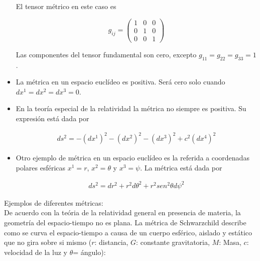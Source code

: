 \begin{remark}
\begin{itemize}


El tensor métrico en este caso es 

$$g_{ij}=\left(\begin{array}{ccc} 1 & 0 & 0 \\  0 & 1 & 0 \\ 0  & 0 & 1
\end{array}
 \right)$$



\bigskip



Las componentes del tensor fundamental son cero, excepto $g_{11}=g_{22}=g_{33}=1$.





    \item 
    La métrica en un espacio euclídeo es positiva. Será cero solo cuando $ dx^{1}= dx^{2} =dx^{3}=0 $.
    
    \item 
    En la teoría especial de la relatividad  la métrica no siempre es positiva. Su expresión está dada por

\begin{eqnarray}\label{ec_8}
ds^{2}=-  (dx^{1})^2-  (dx^{2})^2- (dx^{3})^2 + c^{2}(dx^{4})^2
\end{eqnarray}
\bigskip
\item
   Otro ejemplo de métrica en un espacio euclídeo es la referida  a coordenadas polares esféricas   $ x^{1}=r $, $ x^{2}=\theta $  y $ x^{3}=\psi $. La métrica está   dada por 
   
 \begin{eqnarray}\label{ec_8}
ds^{2}=  dr^{2}+ r^{2} d\theta^{2}+ r^2 sen^{2}\theta d\psi^2
\end{eqnarray}
 
    
    
    \end{itemize}
\end{remark}

\noindent Ejemplos de diferentes métricas:\\

De acuerdo con la teória de la relatividad general en presencia de materia, la geometría del espacio-tiempo no es plana. La métrica de Schwarzchild describe como se curva el espacio-tiempo a causa de un cuerpo esférico, aislado y estático que no gira sobre si mismo ($r$: distancia, $G$: constante gravitatoria, $M$: Masa, $c$: velocidad de la luz y $\theta$= ángulo):\\

